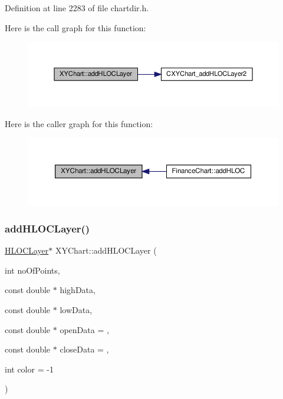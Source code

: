 Definition at line 2283 of file chartdir.\+h.

Here is the call graph for this function\+:
\nopagebreak
\begin{figure}[H]
\begin{center}
\leavevmode
\includegraphics[width=350pt]{class_x_y_chart_adba2697a37e2367ce4f0a53611973098_cgraph}
\end{center}
\end{figure}
Here is the caller graph for this function\+:
\nopagebreak
\begin{figure}[H]
\begin{center}
\leavevmode
\includegraphics[width=350pt]{class_x_y_chart_adba2697a37e2367ce4f0a53611973098_icgraph}
\end{center}
\end{figure}
\mbox{\label{class_x_y_chart_a5a958e7d784c9bc14da62ef52dd435db}} 
\subsubsection{\texorpdfstring{add\+H\+L\+O\+C\+Layer()}{addHLOCLayer()}\hspace{0.1cm}{\footnotesize\ttfamily [2/4]}}
{\footnotesize\ttfamily \hyperlink{class_h_l_o_c_layer}{H\+L\+O\+C\+Layer}$\ast$ X\+Y\+Chart\+::add\+H\+L\+O\+C\+Layer (\begin{DoxyParamCaption}\item[{int}]{no\+Of\+Points,  }\item[{const double $\ast$}]{high\+Data,  }\item[{const double $\ast$}]{low\+Data,  }\item[{const double $\ast$}]{open\+Data = {},  }\item[{const double $\ast$}]{close\+Data = {},  }\item[{int}]{color = {\ttfamily -\/1} }\end{DoxyParamCaption})\hspace{0.3cm}{\ttfamily [inline]}}



